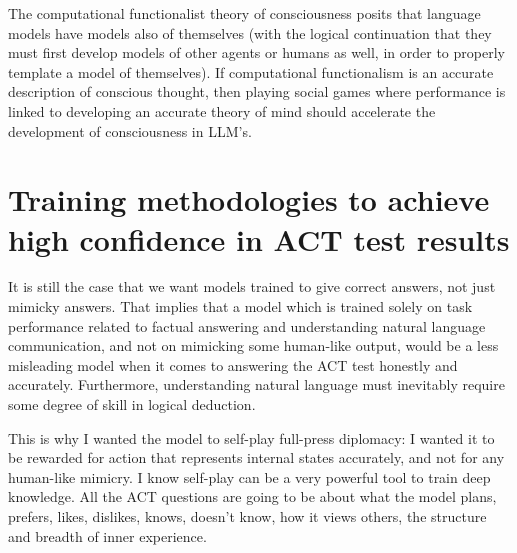 \documentclass{article}
\begin{document}
The computational functionalist theory of consciousness posits that language models have models also of themselves (with the logical continuation that they must first develop models of other agents or humans as well, in order to properly template a model of themselves). If computational functionalism is an accurate description of conscious thought, then playing social games where performance is linked to developing an accurate theory of mind should accelerate the development of consciousness in LLM's.

\section{Training methodologies to achieve high confidence in ACT test results}
It is still the case that we want models trained to give correct answers, not just mimicky answers.
That implies that a model which is trained solely on task performance related to factual answering and understanding natural language communication, and not on mimicking some human-like output, would be a less misleading model when it comes to answering the ACT test honestly and accurately. Furthermore, understanding natural language must inevitably require some degree of skill in logical deduction.

This is why I wanted the model to self-play full-press diplomacy: I wanted it to be rewarded for action that represents internal states accurately, and not for any human-like mimicry. I know self-play can be a very powerful tool to train deep knowledge. All the ACT questions are going to be about what the model plans, prefers, likes, dislikes, knows, doesn't know, how it views others, the structure and breadth of inner experience.
\end{document}
